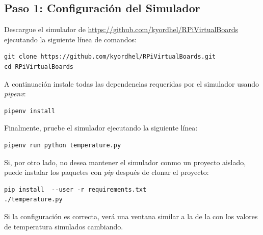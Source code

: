 %
%




\subsection{Paso 1: Configuración del Simulador}%
\label{sec:step1}

Descargue el simulador de \url{https://github.com/kyordhel/RPiVirtualBoards} ejecutando la siguiente línea de comandos:

\begin{Verbatim}[fontsize=\footnotesize]
git clone https://github.com/kyordhel/RPiVirtualBoards.git
cd RPiVirtualBoards
\end{Verbatim}

A continuación instale todas las dependencias requeridas por el simulador usando \emph{pipenv}\footnotemark{}:

\begin{Verbatim}[fontsize=\footnotesize]
pipenv install
\end{Verbatim}

Finalmente, pruebe el simulador ejecutando la siguiente línea:

\begin{Verbatim}[fontsize=\footnotesize]
pipenv run python temperature.py
\end{Verbatim}

Si, por otro lado, no desea mantener el simulador conmo un proyecto aislado, puede instalar los paquetes con \emph{pip} después de clonar el proyecto:

\begin{Verbatim}[fontsize=\footnotesize]
pip install  --user -r requirements.txt
./temperature.py
\end{Verbatim}

Si la configuración es correcta, verá una ventana similar a la de la  con los valores de temperatura simulados cambiando.

